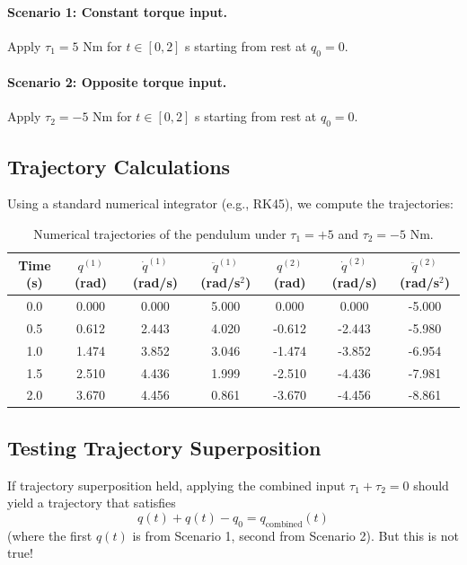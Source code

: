 \paragraph{Scenario 1: Constant torque input.}
Apply $\tau_1 = 5$ N\textperiodcentered{}m for $t \in [0, 2]$ s starting from rest at $q_0 = 0$.

\paragraph{Scenario 2: Opposite torque input.}
Apply $\tau_2 = -5$ N\textperiodcentered{}m for $t \in [0, 2]$ s starting from rest at $q_0 = 0$.

\subsection{Trajectory Calculations}

Using a standard numerical integrator (e.g., RK45), we compute the trajectories:

\begin{table}[h]
\centering
\begin{tabular}{c|ccc|ccc}
Time (s) & $q^{(1)}$ (rad) & $\dot q^{(1)}$ (rad/s) & $\ddot q^{(1)}$ (rad/s$^2$) &
$q^{(2)}$ (rad) & $\dot q^{(2)}$ (rad/s) & $\ddot q^{(2)}$ (rad/s$^2$) \\
\hline
0.0 & 0.000 & 0.000 & 5.000 & 0.000 & 0.000 & -5.000 \\
0.5 & 0.612 & 2.443 & 4.020 & -0.612 & -2.443 & -5.980 \\
1.0 & 1.474 & 3.852 & 3.046 & -1.474 & -3.852 & -6.954 \\
1.5 & 2.510 & 4.436 & 1.999 & -2.510 & -4.436 & -7.981 \\
2.0 & 3.670 & 4.456 & 0.861 & -3.670 & -4.456 & -8.861 \\
\end{tabular}
\caption{Numerical trajectories of the pendulum under $\tau_1 = +5$ and $\tau_2 = -5$ N\textperiodcentered{}m.}
\label{tab:ch3:pendulum-trajectories}
\end{table}

\subsection{Testing Trajectory Superposition}

If trajectory superposition held, applying the combined input $\tau_1 + \tau_2 = 0$ should
yield a trajectory that satisfies
\begin{equation}
q(t) + q(t) - q_0 = q_{\text{combined}}(t)
\end{equation}
(where the first $q(t)$ is from Scenario 1, second from Scenario 2). But this is not true!

